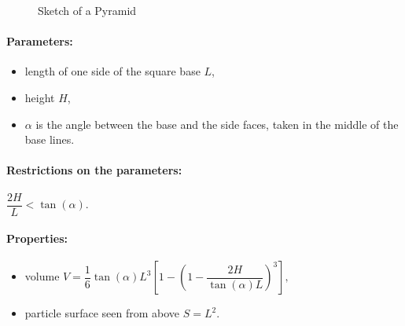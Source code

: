 \begin{figure}[ht]
\hfill
{}
\hfill
{}
\hfill
\caption{Sketch of a Pyramid}
\label{fig:pyramid}
\end{figure}

\FloatBarrier

\paragraph{Parameters:}
\begin{itemize}
\item length of one side of the square base $L$,  
\item height $H$,
\item  $\alpha$ is the angle between the base and the
  side faces, taken in the middle of the base lines.
\end{itemize}

\paragraph{Restrictions on the parameters:}  $\dfrac{2H}{L} < \tan(\alpha)$.

\paragraph{Properties:}
\begin{itemize}
\item  volume $V = \dfrac{1}{6} \tan(\alpha) L^3\left[ 1
             - \left(1 - \dfrac{2H}{\tan(\alpha)L}\right)^3 \right],$
\item particle surface seen from above $S = L^2$.
\end{itemize}

